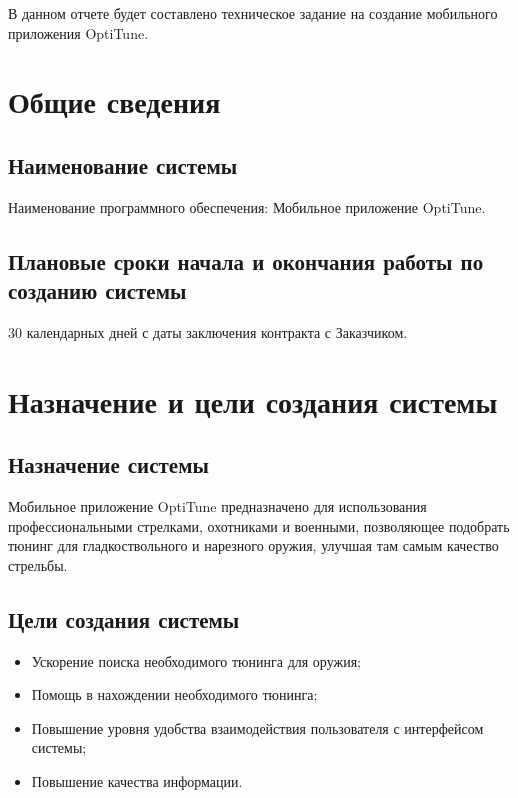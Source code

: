 \documentclass[14pt]{extreport}
\begin{document}
\pagestyle{empty} 


\pagestyle{plain}
\tableofcontents
 

\intro 

В данном отчете будет составлено техническое задание на создание мобильного приложения OptiTune.

\chapter{Общие сведения}
\section{Наименование системы}
Наименование программного обеспечения: Мобильное приложение OptiTune.

\section{Плановые сроки начала и окончания работы по созданию системы}
30 календарных дней с даты заключения контракта с Заказчиком.

\chapter{Назначение и цели создания системы}
\section{Назначение системы}
Мобильное приложение OptiTune предназначено для использования профессиональными стрелками, охотниками и военными, позволяющее подобрать тюнинг для гладкоствольного и нарезного оружия, улучшая там самым качество стрельбы.

\section{Цели создания системы}

\begin{itemize}
	\item Ускорение поиска необходимого тюнинга для оружия;	
	\item Помощь в нахождении необходимого тюнинга;
	\item Повышение уровня удобства взаимодействия пользователя с интерфейсом системы;
	\item Повышение качества информации.
\end{itemize}
\end{document}
